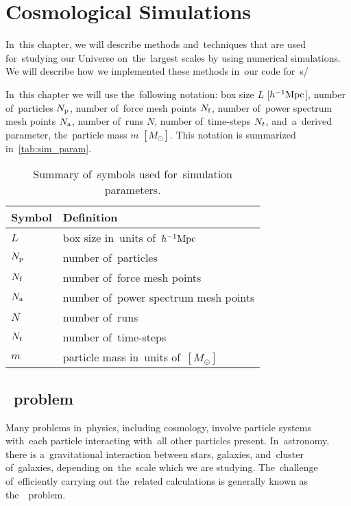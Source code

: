\chapter{Cosmological Simulations}
\label{chpt:cosmo_sim}
In~this chapter, we will describe methods and~techniques that are used for~studying our Universe on~the~largest scales by using numerical simulations. We will describe how we implemented these methods in~our code for~\nbodysim s/

In~this chapter we will use the~following notation: box size $L$ [$h^{-1}\text{Mpc}$], number of~particles $N_{\rm p}$, number of~force mesh points $N_{\rm f}$, number of~power spectrum mesh points $N_{\rm a}$, number of~runs $N$, number of~time-steps $N_t$, and~a~derived parameter, the~particle mass $m$ $[M_\odot]$. This notation is summarized in~\autoref{tab:sim_param}.

\begin{table}
\centering
\begin{tabular}{ll}
    \hline \hline
    Symbol & Definition \\
    \hline
    $L$ & box size in~units of~$h^{-1}\text{Mpc}$ \\
    $N_{\rm p}$ & number of~particles \\
    $N_{\rm f}$ & number of~force mesh points \\
    $N_{\rm a}$ & number of~power spectrum mesh points \\
    $N$ & number of~runs \\
    $N_t$ & number of~time-steps \\
    $m$ & particle mass in~units of~$[M_\odot]$ \\
    \hline \hline
\end{tabular}
\caption{Summary of~symbols used for~simulation parameters.}
\label{tab:sim_param}
\end{table}


\section{\nbody\ problem}
Many problems in~physics, including cosmology, involve particle systems with~each particle interacting with~all other particles present. In~astronomy, there is a~gravitational interaction between stars, galaxies, and~cluster of~galaxies, depending on~the~scale which we are studying. The~challenge of~efficiently carrying out the~related calculations is generally known as the~\nbody\ problem.

